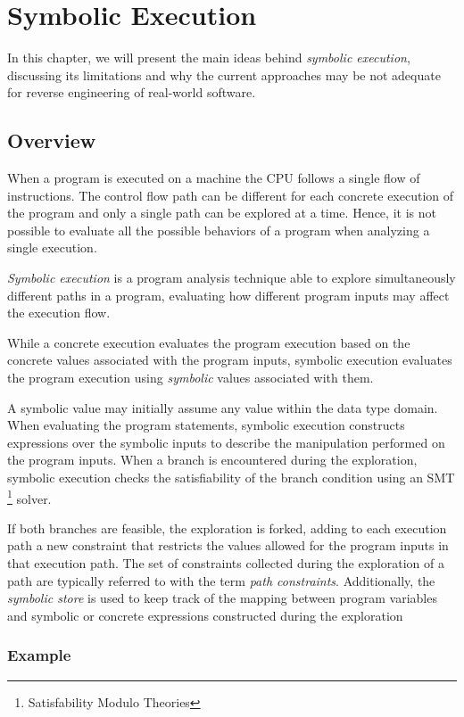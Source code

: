 \chapter{Symbolic Execution}

In this chapter, we will present the main ideas behind {\em symbolic execution}, discussing its limitations and why the current approaches may be not adequate for reverse engineering of real-world software.

\section{Overview}

When a program is executed on a machine the CPU follows a single flow of instructions.
The control flow path can be different for each concrete execution of the program and only a single path can be explored at a time.
Hence, it is not possible to evaluate all the possible behaviors of a program when analyzing a single execution.

{\em Symbolic execution} is a program analysis technique able to explore simultaneously different paths in a program, evaluating how different program inputs may affect the execution flow.

While a concrete execution evaluates the program execution based on the concrete values associated with the program inputs, symbolic execution evaluates the program execution using {\em symbolic} values associated with them.

A symbolic value may initially assume any value within the data type domain. When evaluating the program statements, symbolic execution constructs expressions over the symbolic inputs to describe the manipulation performed on the program inputs. When a branch is encountered during the exploration, symbolic execution checks the satisfiability of the branch condition using an SMT \footnote{Satisfability Modulo Theories} solver.

If both branches are feasible, the exploration is forked, adding to each execution path a new constraint that restricts the values allowed for the program inputs in that execution path. The set of constraints collected during the exploration of a path are typically referred to with the term {\em path constraints}. Additionally, the {\em symbolic store} is used to keep track of the mapping between program variables and symbolic or concrete expressions constructed during the exploration

\subsection{Example}

